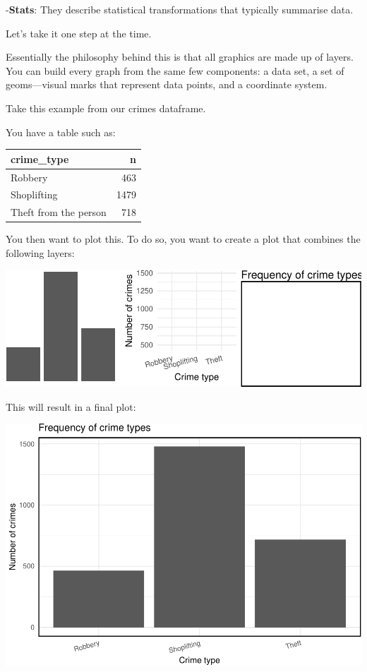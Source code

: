 \documentclass[
]{book}
\begin{document}
-\textbf{Stats}: They describe statistical transformations that typically summarise data.

Let's take it one step at the time.

Essentially the philosophy behind this is that all graphics are made up of layers. You can build every graph from the same few components: a data set, a set of geoms---visual marks that represent data points, and a coordinate system.

Take this example from our crimes dataframe.

You have a table such as:

\begin{tabular}{l|r}
\hline
crime\_type & n\\
\hline
Robbery & 463\\
\hline
Shoplifting & 1479\\
\hline
Theft from the person & 718\\
\hline
\end{tabular}

You then want to plot this. To do so, you want to create a plot that combines the following layers:

\includegraphics{crime_mapping_files/figure-latex/unnamed-chunk-5-1.pdf}

This will result in a final plot:

\includegraphics{crime_mapping_files/figure-latex/unnamed-chunk-6-1.pdf}
\end{document}
